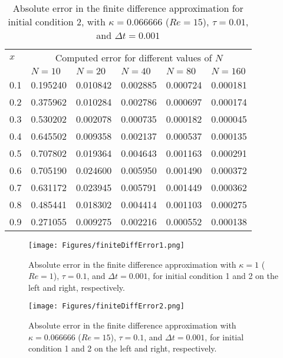 \documentclass[undefended]{sfuthesis}
\begin{document}
\begin{table}[!h]%
	\centering
	\begin{threeparttable}
		\caption{Absolute error in the finite difference approximation for initial condition 2, with $\kappa = 0.066666$ ($Re = 15$), $\tau = 0.01$, and $\Delta t = 0.001$}
		\label{tab:error6}
		\begin{tabular}{p{.13\linewidth} p{.15\linewidth} p{.15\linewidth} p{.15\linewidth} p{.15\linewidth} p{.1\linewidth}}
			\toprule
			$x$ & \multicolumn{5}{c}{Computed error for different values of $N$} \\
			\cmidrule{2-6}
			& $N = 10$ & $N = 20$ & $N = 40$ & $N = 80$ & $N = 160$ \\
			\midrule
			0.1 & 0.195240 & 0.010842 & 0.002885 & 0.000724 & 0.000181 \\
			0.2 & 0.375962 & 0.010284 & 0.002786 & 0.000697 & 0.000174 \\
			0.3 & 0.530202 & 0.002078 & 0.000735 & 0.000182 & 0.000045 \\
			0.4 & 0.645502 & 0.009358 & 0.002137 & 0.000537 & 0.000135 \\
			0.5 & 0.707802 & 0.019364 & 0.004643 & 0.001163 & 0.000291 \\
			0.6 & 0.705190 & 0.024600 & 0.005950 & 0.001490 & 0.000372 \\
			0.7 & 0.631172 & 0.023945 & 0.005791 & 0.001449 & 0.000362 \\
			0.8 & 0.485441 & 0.018302 & 0.004414 & 0.001103 & 0.000275 \\
			0.9 & 0.271055 & 0.009275 & 0.002216 & 0.000552 & 0.000138 \\
			\bottomrule
		\end{tabular}
	\end{threeparttable}
\end{table}
\clearpage

\begin{figure}[!h]
	\centering
	\texttt{[image: Figures/finiteDiffError1.png]}
	\caption{Absolute error in the finite difference approximation with $\kappa = 1$ ($Re = 1$), $\tau = 0.1$, and $\Delta t = 0.001$, for initial condition 1 and 2 on the left and right, respectively.}
	\label{fig:finiteDiffError1}
\end{figure}

\begin{figure}[!h]
	\centering
	\texttt{[image: Figures/finiteDiffError2.png]}
	\caption{Absolute error in the finite difference approximation with $\kappa = 0.066666$ ($Re = 15$), $\tau = 0.1$, and $\Delta t = 0.001$, for initial condition 1 and 2 on the left and right, respectively.}
	\label{fig:finiteDiffError2}
\end{figure}
\end{document}
